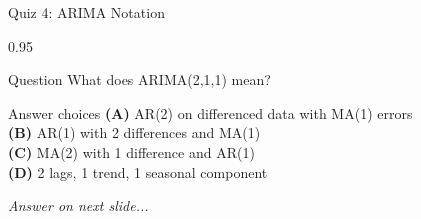 \documentclass[9pt, aspectratio=169, t]{beamer}
\begin{document}
\begin{frame}{Quiz 4: ARIMA Notation}
    \begin{cminipage}{0.95\textwidth}
    \begin{alertblock}{Question}
        What does ARIMA(2,1,1) mean?
    \end{alertblock}

    \vspace{0.4cm}

    \begin{block}{Answer choices}
        \textcolor{MainBlue}{\textbf{(A)}} AR(2) on differenced data with MA(1) errors\\[3pt]
        \textcolor{MainBlue}{\textbf{(B)}} AR(1) with 2 differences and MA(1)\\[3pt]
        \textcolor{MainBlue}{\textbf{(C)}} MA(2) with 1 difference and AR(1)\\[3pt]
        \textcolor{MainBlue}{\textbf{(D)}} 2 lags, 1 trend, 1 seasonal component
    \end{block}

    \vspace{0.5cm}

    \begin{center}
        \textit{Answer on next slide...}
    \end{center}
    \end{cminipage}
\end{frame}
\end{document}
